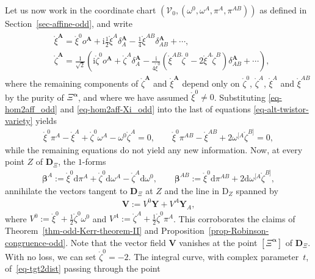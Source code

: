 \documentclass[pdftex]{sigma}
\numberwithin{equation}{section}
\newcommand{\mbf} [1]{\mathbf{#1}}
\newcommand{\mc} [1]{\mathcal{#1}}
\newcommand{\Drm} {{\mathrm{D}}}
\newcommand{\dd} {\mathrm{d}}
\newcommand{\ii} {\mathrm{i}}
\newcommand{\mr}[1] {\mathring{#1}}
\begin{document}
Let us now work in the coordinate chart $(\mc{V}_0 , ( \omega^0, \omega^A , \pi^A , \pi^{AB} )) $ as def\/ined in Section~\ref{sec-affine-odd}, and write
\begin{gather}\label{eq-hom2aff-Xi_odd}\begin{split}
&\mr{\xi}^{\mbf{A}} = \mr{\xi}^0 o^{\mbf{A}} + \ii \frac{1}{2} \mr{\xi}^A \delta_A^{\mbf{A}} - \frac{1}{4} \mr{\xi}^{AB} \delta_{AB}^{\mbf{A}} + \cdots , \\
&\mr{\zeta}^{\mbf{A}} = \frac{1}{\sqrt{2}} \left( \ii \mr{\zeta}^0 o^{\mbf{A}} + \mr{\zeta}^A \delta_A^{\mbf{A}} - \frac{\ii}{4 \mr{\xi}^0} \left( \mr{\xi}^{AB} \mr{\zeta}^0 - 2 \mr{\xi}^A \mr{\zeta}^B \right) \delta_{AB}^{\mbf{A}} + \cdots \right) ,
\end{split}
\end{gather}
where the remaining components of $\mr{\zeta}^{\mbf{A}}$ and $\mr{\xi}^{\mbf{A}}$ depend only on $\mr{\zeta}^0$, $\mr{\zeta}^A$, $\mr{\xi}^A$ and $\mr{\xi}^{AB}$ by the purity of $\Xi^{{\bm{\upalpha}}}$, and where we have assumed $\mr{\xi}^0 \neq 0$.
Substituting \eqref{eq-hom2aff_odd} and \eqref{eq-hom2aff-Xi_odd} into the last of equations \eqref{eq-alt-twistor-variety} yields
\begin{gather*}
\mr{\xi}^0 \pi^{A} - \mr{\xi}^{A} + \mr{\zeta}^0 \omega^{A} - \omega^0 \mr{\zeta}^{A} = 0 , \qquad
\mr{\xi}^0 \pi^{AB} - \mr{\xi}^{AB} + 2 \omega^{[A} \mr{\zeta}^{B]} = 0 ,
\end{gather*}
while the remaining equations do not yield any new information. Now, at every point $Z$ of $\mbf{D}_\Xi$, the $1$-forms
\begin{gather*}
\bm{\beta}^{A} := \mr{\xi}^0 \dd \pi^A + \mr{\zeta}^0 \dd \omega^A - \mr{\zeta}^A \dd \omega^0 , \qquad
\bm{\beta}^{AB} := \mr{\xi}^0 \dd \pi^{AB} + 2 \dd \omega^{[A} \mr{\zeta}^{B]} ,
\end{gather*}
annihilate the vectors tangent to $\mbf{D}_\Xi$ at $Z$ and the line in $\Drm_Z$ spanned by
\begin{gather}\label{eq-tgt2dist}
\bm{V} := V^0 \bm{Y} + V^A \bm{Y}_A ,
\end{gather}
where $V^0 := \mr{\xi}^0 + \frac{1}{2} \mr{\zeta}^0 \omega^0$ and $V^A := \mr{\zeta}^A + \frac{1}{2} \mr{\zeta}^0 \pi^A$. This corroborates the claims of Theorem~\ref{thm-odd-Kerr-theorem-II} and Proposition~\ref{prop-Robinson-congruence-odd}. Note that the vector f\/ield $\bm{V}$ vanishes at the point $[\Xi^{\mbf{\upalpha}}]$ of $\mbf{D}_\Xi$. With no loss, we can set $\mr{\zeta}^0 = -2$. The integral curve, with complex parameter~$t$, of~\eqref{eq-tgt2dist} passing through the point
\end{document}
